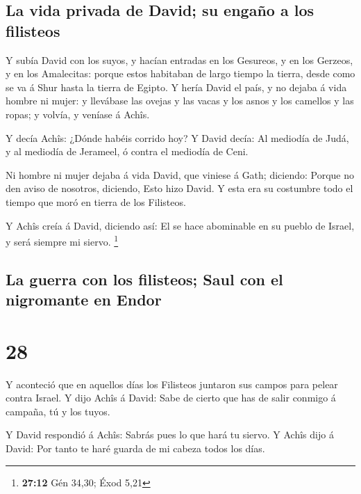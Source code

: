 \hypertarget{la-vida-privada-de-david-su-engauxf1o-a-los-filisteos}{%
\subsection{La vida privada de David; su engaño a los
filisteos}\label{la-vida-privada-de-david-su-engauxf1o-a-los-filisteos}}

 Y subía David con los suyos, y hacían entradas en los
Gesureos, y en los Gerzeos, y en los Amalecitas: porque estos habitaban
de largo tiempo la tierra, desde como se va á Shur hasta la tierra de
Egipto.  Y hería David el país, y no dejaba á vida hombre ni
mujer: y llevábase las ovejas y las vacas y los asnos y los camellos y
las ropas; y volvía, y veníase á Achîs.

 Y decía Achîs: ¿Dónde habéis corrido hoy? Y David decía:
Al mediodía de Judá, y al mediodía de Jerameel, ó contra el mediodía de
Ceni.

 Ni hombre ni mujer dejaba á vida David, que viniese á
Gath; diciendo: Porque no den aviso de nosotros, diciendo, Esto hizo
David. Y esta era su costumbre todo el tiempo que moró en tierra de los
Filisteos.

 Y Achîs creía á David, diciendo así: El se hace abominable
en su pueblo de Israel, y será siempre mi siervo. \footnote{\textbf{27:12}
  Gén 34,30; Éxod 5,21}

\hypertarget{la-guerra-con-los-filisteos-saul-con-el-nigromante-en-endor}{%
\subsection{La guerra con los filisteos; Saul con el nigromante en
Endor}\label{la-guerra-con-los-filisteos-saul-con-el-nigromante-en-endor}}

\hypertarget{section-27}{%
\section{28}\label{section-27}}

 Y aconteció que en aquellos días los Filisteos juntaron sus
campos para pelear contra Israel. Y dijo Achîs á David: Sabe de cierto
que has de salir conmigo á campaña, tú y los tuyos.

 Y David respondió á Achîs: Sabrás pues lo que hará tu
siervo. Y Achîs dijo á David: Por tanto te haré guarda de mi cabeza
todos los días.

